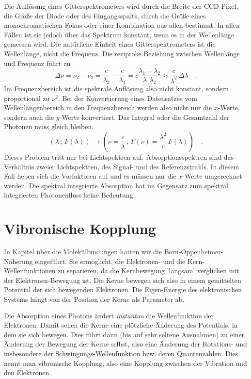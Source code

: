 Die Auflösung eines Gitterspektrometers wird durch die Breite der CCD-Pixel, die Größe der Diode oder des Eingangsspalts, durch die Größe eines monochromatischen Fokus oder einer Kombination aus allen bestimmt. In allen Fällen ist sie jedoch über das Spektrum konstant, wenn es in der Wellenlänge gemessen wird. Die natürliche Einheit eines Gitterspektrometers ist die Wellenlänge, nicht die Frequenz. Die reziproke Beziehung zwischen Wellenlänge und Frequenz führt zu 
\begin{equation}
 \Delta \nu = \nu_2 - \nu_2 = \frac{c}{\lambda_2} - \frac{c}{\lambda_1}  = c \frac{\lambda_1 - \lambda_2}{\lambda_1 \lambda_2} \approx \frac{c}{\lambda^2} \, \Delta \lambda \quad .
\end{equation}
Im Frequenzbereich ist die spektrale Auflösung also nicht konstant, sondern proportional zu $\nu^2$. Bei der Konvertierung eines Datensatzes vom Wellenlängenbereich in den Frequenzbereich werden also nicht nur die $x$-Werte, sondern auch die $y$-Werte konvertiert. Das Integral oder die Gesamtzahl der Photonen muss gleich bleiben.
\begin{equation}
 \left( \lambda \, ; \, F(\lambda) \right) \, \rightarrow  \left( \nu = \frac{c}{ \lambda} \, ; \,  F(\nu) = \frac{\lambda^2}{ c } \, F(\lambda) \right)  \quad .
\end{equation}
Dieses Problem tritt nur bei Lichtspektren auf. Absorptionsspektren sind das Verhältnis zweier Lichtspektren, des Signal- und des Referenzstrahls. In diesem Fall heben sich die Vorfaktoren auf und es müssen nur die $x$-Werte umgerechnet werden. Die spektral integrierte Absorption hat im Gegensatz zum spektral integrierten Photonenfluss keine Bedeutung.



\section{Vibronische Kopplung}

In Kapitel über die Molekülbindungen hatten wir die Born-Oppenheimer-Näherung eingeführt. Sie ermöglicht, die Elektronen- und die Kern-Wellenfunktionen zu separieren, da die Kernbewegung 'langsam' verglichen mit der Elektronen-Bewegung ist. Die Kerne bewegen sich also in einem gemittelten Potential der sich bewegenden Elektronen. Die Eigen-Energie des elektronischen Systems hängt von der Position der Kerne als Parameter ab.

Die Absorption eines Photons ändert \emph{instantan} die Wellenfunktion der Elektronen. Damit sehen die Kerne eine plötzliche Änderung des Potentials, in dem sie sich bewegen. Dies führt dann (bis auf sehr seltene Ausnahmen) zu einer Änderung der Bewegung der Kerne selbst, also eine Änderung der Rotations- und insbesondere der Schwingungs-Wellenfunktion bzw. deren Quantenzahlen. Dies nennt man vibronische Kopplung, also eine Kopplung zwischen der Vibration und den Elektronen.

